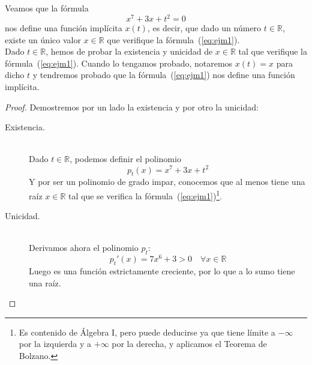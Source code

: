 \begin{ejemplo}
    Veamos que la fórmula
    \begin{equation}\label{eq:ejm1}
        x^7+3x+t^2 = 0
    \end{equation}
    nos define una función implícita $x(t)$, es decir, que dado un número $t\in \mathbb{R}$, existe un único valor $x\in \mathbb{R}$ que verifique la fórmula~(\ref{eq:ejm1}).\\

    Dado $t\in \mathbb{R}$, hemos de probar la existencia y unicidad de $x\in \mathbb{R}$ tal que verifique la fórmula~(\ref{eq:ejm1}). Cuando lo tengamos probado, notaremos $x(t) = x$ para dicho $t$ y tendremos probado que la fórmula~(\ref{eq:ejm1}) nos define una función implícita.
    \begin{proof} Demostremos por un lado la existencia y por otro la unicidad:
        \begin{description}
            \item [Existencia.]~\\
                Dado $t\in \mathbb{R}$, podemos definir el polinomio
                \begin{equation*}
                    p_t(x) = x^7+3x+t^2
                \end{equation*}
                Y por ser un polinomio de grado impar, conocemos que al menos tiene una raíz $x\in \mathbb{R}$ tal que se verifica la fórmula~(\ref{eq:ejm1})\footnote{Es contenido de Álgebra I, pero puede deducirse ya que tiene límite a $-\infty$ por la izquierda y a $+\infty$ por la derecha, y aplicamos el Teorema de Bolzano.}.\\
            \item [Unicidad.]~\\
                Derivamos ahora el polinomio $p_t$:
                \begin{equation*}
                    p_t'(x) = 7x^6+3 > 0 \quad \forall x\in \mathbb{R}
                \end{equation*}
                Luego es una función estrictamente creciente, por lo que a lo sumo tiene una raíz.
        \end{description}
    \end{proof}
\end{ejemplo}

